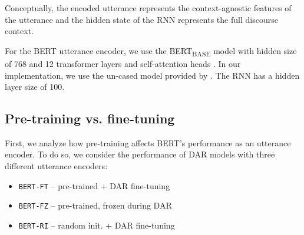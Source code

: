 \documentclass[11pt,a4paper]{article}
\begin{document}
Conceptually, the encoded utterance represents the context-agnostic features of the utterance 
and the hidden state of the RNN represents the full discourse context.


For the BERT utterance encoder, we use the BERT\textsubscript{BASE} model with hidden size of 768 and 12 transformer layers and self-attention heads \citep[][\S3.1]{devlinBERTPretrainingDeep2018}.
In our implementation, we use the un-cased model provided by \citet{wolfHuggingFaceTransformersStateoftheart2019}.
The RNN has a hidden layer size of 100.

\subsection{Pre-training vs. fine-tuning} \label{sec:experiment2} %
First, we analyze how pre-training affects BERT's performance as an utterance encoder.
To do so, we consider the performance of DAR models with three different utterance encoders:
\begin{itemize}\setlength\itemsep{-0.5em}
  \item \texttt{BERT-FT} -- pre-trained + DAR fine-tuning 
  \item \texttt{BERT-FZ} -- pre-trained, frozen during DAR
  \item \texttt{BERT-RI} -- random init. + DAR fine-tuning 
\end{itemize}

\end{document}
